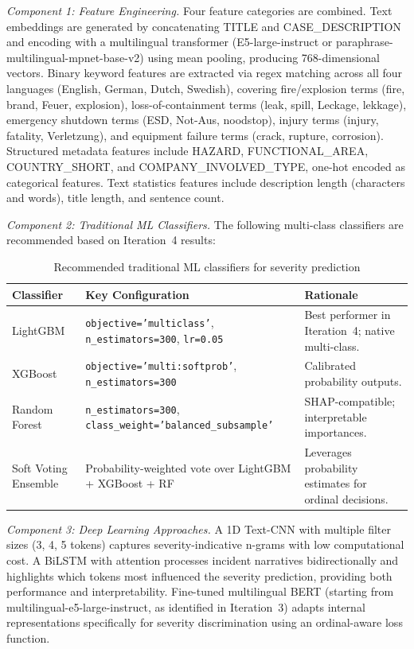 \documentclass[11pt, titlepage, bibliography=totoc]{scrreprt}
\begin{document}
\textit{Component 1: Feature Engineering.}
Four feature categories are combined. Text embeddings are generated by concatenating TITLE and CASE\_DESCRIPTION and encoding with a multilingual transformer (E5-large-instruct or paraphrase-multilingual-mpnet-base-v2) using mean pooling, producing 768-dimensional vectors. Binary keyword features are extracted via regex matching across all four languages (English, German, Dutch, Swedish), covering fire/explosion terms (fire, brand, Feuer, explosion), loss-of-containment terms (leak, spill, Leckage, lekkage), emergency shutdown terms (ESD, Not-Aus, noodstop), injury terms (injury, fatality, Verletzung), and equipment failure terms (crack, rupture, corrosion). Structured metadata features include HAZARD, FUNCTIONAL\_AREA, COUNTRY\_SHORT, and COMPANY\_INVOLVED\_TYPE, one-hot encoded as categorical features. Text statistics features include description length (characters and words), title length, and sentence count.

\textit{Component 2: Traditional ML Classifiers.}
The following multi-class classifiers are recommended based on Iteration~4 results:

\begin{table}[H]
\centering
\caption{Recommended traditional ML classifiers for severity prediction}
\label{tab:severity_classifiers}
\begin{tabular}{lll}
\toprule
\textbf{Classifier} & \textbf{Key Configuration} & \textbf{Rationale} \\
\midrule
LightGBM        & \texttt{objective='multiclass'}, \texttt{n\_estimators=300}, \texttt{lr=0.05} & Best performer in Iteration~4; native multi-class. \\
XGBoost         & \texttt{objective='multi:softprob'}, \texttt{n\_estimators=300}              & Calibrated probability outputs. \\
Random Forest   & \texttt{n\_estimators=300}, \texttt{class\_weight='balanced\_subsample'}      & SHAP-compatible; interpretable importances. \\
Soft Voting Ensemble & Probability-weighted vote over LightGBM + XGBoost + RF              & Leverages probability estimates for ordinal decisions. \\
\bottomrule
\end{tabular}
\end{table}

\textit{Component 3: Deep Learning Approaches.}
A 1D Text-CNN with multiple filter sizes (3, 4, 5 tokens) captures severity-indicative n-grams with low computational cost. A BiLSTM with attention processes incident narratives bidirectionally and highlights which tokens most influenced the severity prediction, providing both performance and interpretability. Fine-tuned multilingual BERT (starting from multilingual-e5-large-instruct, as identified in Iteration~3) adapts internal representations specifically for severity discrimination using an ordinal-aware loss function.
\end{document}
